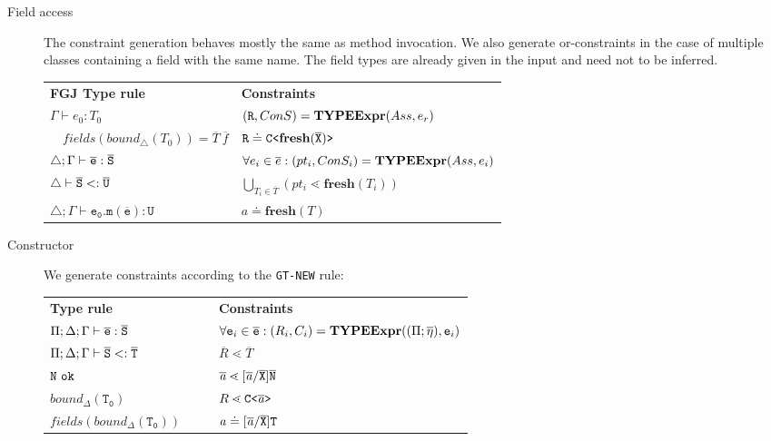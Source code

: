 \begin{description}
\item[Field access]
The constraint generation behaves mostly the same as method invocation.
We also generate or-constraints in the case of multiple classes containing a field with the same name.
The field types are already given in the input and need not to be inferred.

 \begin{tabular}{l|l}
   \textbf{FGJ Type rule} & \textbf{Constraints} \\
   $\Gamma \vdash e_0:T_0$ & $(\texttt{R}, ConS) = \textbf{TYPEExpr}(Ass, e_r)$\\ 
   $\quad \mathit{fields}(\mathit{bound}_\triangle(T_0)) = \overline{T} \ \overline{f}$ & $\texttt{R} \doteq \mathtt{C \texttt{<} \textbf{fresh}(\overline{\tt X}) \texttt{>} }$ \\
  $\triangle; \Gamma \vdash \overline{\tt e} : \overline{\tt S}$ & $\forall e_i \in \overline{e} : (pt_i, ConS_i) = \textbf{TYPEExpr}(Ass, e_i)$\\
  $\triangle \vdash \overline{\tt S} <: \overline{\tt U}$ & $ \bigcup_{T_i \in \overline{T}} (pt_i \lessdot \textbf{fresh}(T_i))$\\
  $\triangle; \Gamma \vdash \mathtt{e_0.m(\overline{e}) : U }$ & $a \doteq \textbf{fresh}(T)$ \\
 \end{tabular}
 \fi
 \item[Constructor] We generate constraints according to the \texttt{GT-NEW} rule:\\
 \begin{tabularx}{\linewidth}{lX|Xl}
  \textbf{\TFGJ{} Type rule} &&& \textbf{Constraints} \\
  $\Pi;\Delta;\Gamma \vdash \overline{\tt e} : \overline{\tt S}$ &&& $\forall \texttt{e}_i \in \overline{\texttt{e}} : (R_i, C_i) = \textbf{TYPEExpr}(({\Pi} ;
  \overline{\mathtt{\eta}}), \texttt{e}_i)$\\
  $\Pi;\Delta;\Gamma \vdash \overline{\tt S} <: \overline{\tt T}$ &&& $\overline{R} \lessdot \overline{T}$\\
  $\type{N}\ \texttt{ok}$ &&& $\overline{\mathit{ a }} \lessdot
  [\overline{\mathit{ a }}/\overline{\tt X}]\overline{\tt N}$\\
  $\mathtt{\mathit{bound}_\Delta (T_0)}$ &&& ${R} \lessdot \mathtt{C \texttt{<} \overline{\tt \mathit{ a }} \texttt{>} }$ \\
  $\mathtt{\mathit{fields}(\mathit{bound}_\Delta (T_0))}$ &&& $\mathit{ a } \doteq [\overline{\mathit{ a }}/\overline{\tt X}]\texttt{T}$
\end{tabularx}


\end{description}

